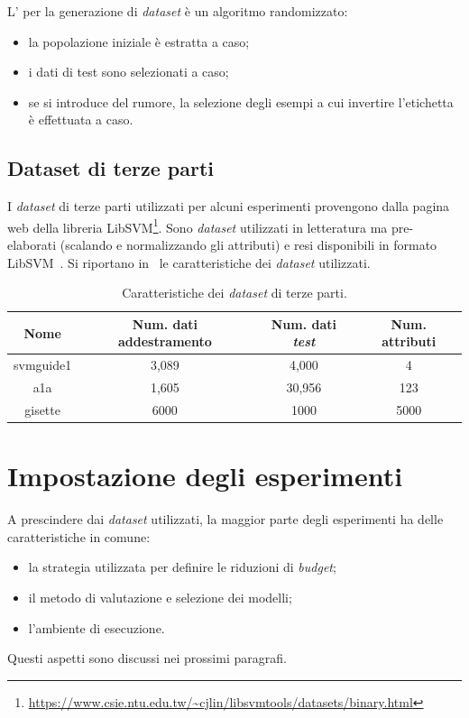 L' per la generazione di \emph{dataset} è un algoritmo randomizzato:
\begin{itemize}
    \item la popolazione iniziale è estratta a caso;
    \item i dati di test sono selezionati a caso;
    \item se si introduce del rumore, la selezione degli esempi a cui invertire l'etichetta è effettuata a caso.
\end{itemize}

\subsection{Dataset di terze parti}
I \emph{dataset} di terze parti utilizzati per alcuni esperimenti provengono dalla pagina web della libreria LibSVM\footnote{\url{https://www.csie.ntu.edu.tw/~cjlin/libsvmtools/datasets/binary.html}}.
Sono \emph{dataset} utilizzati in letteratura ma pre-elaborati (scalando e normalizzando gli attributi) e resi disponibili in formato LibSVM~\cite{libsvm}.
Si riportano in~ le caratteristiche dei \emph{dataset} utilizzati.
\begin{table}
    \centering
    \begin{tabular}{cccc}
        \toprule
        Nome & Num. dati addestramento & Num. dati \emph{test} & Num. attributi\\
        \midrule
        svmguide1 &  3,089 & 4,000 & 4 \\
        a1a & 1,605	& 30,956 & 123\\
        gisette & 6000 & 1000 & 5000 \\
        \bottomrule
    \end{tabular}
    \caption{Caratteristiche dei \emph{dataset} di terze parti.}
    \label{tab:uci_datasets}
\end{table}


\section{Impostazione degli esperimenti}\label{sec:impostazione_esperimenti}
A prescindere dai \emph{dataset} utilizzati, la maggior parte degli esperimenti ha delle caratteristiche in comune:
\begin{itemize}
    \item la strategia utilizzata per definire le riduzioni di \emph{budget};
    \item il metodo di valutazione e selezione dei modelli;
    \item l'ambiente di esecuzione.
\end{itemize}
Questi aspetti sono discussi nei prossimi paragrafi.

